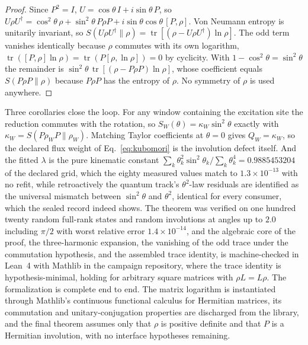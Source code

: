 \documentclass[aps,prd,reprint,nofootinbib,longbibliography]{revtex4-2}
\begin{document}
\begin{proof}
Since $P^2 = I$, $U = \cos\theta\, I + i \sin\theta\, P$, so
$U\rho U^{\dagger} = \cos^2\!\theta\,\rho + \sin^2\!\theta\, P\rho P
+ i \sin\theta\cos\theta\,[P,\rho]$.  Von Neumann entropy is
unitarily invariant, so
$S(U\rho U^{\dagger}\|\rho) =
 \operatorname{tr}[(\rho - U\rho U^{\dagger})\ln\rho]$.  The odd
term vanishes identically because $\rho$ commutes with its own
logarithm, $\operatorname{tr}([P,\rho]\ln\rho)
= \operatorname{tr}(P[\rho,\ln\rho]) = 0$ by cyclicity.  With
$1 - \cos^2\!\theta = \sin^2\!\theta$ the remainder is
$\sin^2\!\theta\,\operatorname{tr}[(\rho - P\rho P)\ln\rho]$, whose
coefficient equals $S(P\rho P\|\rho)$ because $P\rho P$ has the
entropy of $\rho$.  No symmetry of $\rho$ is used anywhere.
\end{proof}

Three corollaries close the loop.  For any window containing the
excitation site the reduction commutes with the rotation, so
$S_W(\theta) = \kappa_W \sin^2\!\theta$ exactly with
$\kappa_W = S(P\rho_W P\|\rho_W)$.  Matching Taylor coefficients at
$\theta = 0$ gives $Q_W = \kappa_W$, so the declared flux weight of
Eq.~\eqref{eq:kubomori} is the involution defect itself.  And the
fitted $\lambda$ is the pure kinematic constant
$\sum_k \theta_k^2 \sin^2\!\theta_k / \sum_k \theta_k^4
= 0.9885453204$ of the declared grid, which the eighty measured
values match to $1.3\times 10^{-13}$ with no refit, while
retroactively the quantum track's $\theta^2$-law residuals are
identified as the universal mismatch between $\sin^2\!\theta$ and
$\theta^2$, identical for every consumer, which the sealed record
indeed shows.  The theorem was verified on one hundred twenty random
full-rank states and random involutions at angles up to $2.0$
including $\pi/2$ with worst relative error $1.4\times 10^{-14}$,
and the algebraic core of the proof, the three-harmonic expansion,
the vanishing of the odd trace under the commutation hypothesis, and
the assembled trace identity, is machine-checked in Lean~4 with
Mathlib in the campaign repository, where the trace identity is
hypothesis-minimal, holding for arbitrary square matrices with
$\rho L = L\rho$.  The formalization is complete end to end.  The
matrix logarithm is instantiated through Mathlib's continuous
functional calculus for Hermitian matrices, its commutation and
unitary-conjugation properties are discharged from the library, and
the final theorem assumes only that $\rho$ is positive definite and
that $P$ is a Hermitian involution, with no interface hypotheses
remaining.
\end{document}
